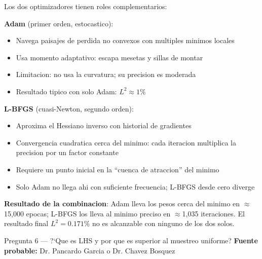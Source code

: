 \begin{answerbox}
Los dos optimizadores tienen roles complementarios:

\textbf{Adam} (primer orden, estocastico):
\begin{itemize}
  \item Navega paisajes de perdida no convexos con multiples minimos locales
  \item Usa momento adaptativo: escapa mesetas y sillas de montar
  \item Limitacion: no usa la curvatura; su precision es moderada
  \item Resultado tipico con solo Adam: $L^2 \approx 1\%$
\end{itemize}

\textbf{L-BFGS} (cuasi-Newton, segundo orden):
\begin{itemize}
  \item Aproxima el Hessiano inverso con historial de gradientes
  \item Convergencia cuadratica cerca del minimo: cada iteracion multiplica la
        precision por un factor constante
  \item Requiere un punto inicial en la ``cuenca de atraccion'' del minimo
  \item Solo Adam no llega ahi con suficiente frecuencia; L-BFGS desde cero diverge
\end{itemize}

\textbf{Resultado de la combinacion}: Adam lleva los pesos cerca del minimo en
$\approx$15,000 epocas; L-BFGS los lleva al minimo preciso en $\approx$1,035
iteraciones. El resultado final $L^2 = 0.171\%$ no es alcanzable con ninguno
de los dos solos.
\end{answerbox}

\vspace{8pt}

\begin{qabox}{Pregunta 6 --- ?`Que es LHS y por que es superior al muestreo uniforme?}
\textbf{Fuente probable:} Dr. Pancardo Garcia o Dr. Chavez Bosquez
\end{qabox}

